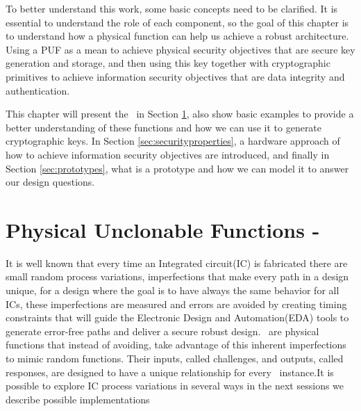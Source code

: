 
To better understand this work, some basic concepts need to be clarified. It is essential to understand the role of each component, so the goal of this chapter is to understand how a physical function can help us achieve a robust architecture. Using a PUF as a mean to achieve physical security objectives that are secure key generation and storage,  and then using this key together with cryptographic primitives to achieve information security objectives that are data integrity and authentication.  

This chapter will present the  \pufs~in Section \ref{sec:pufs}, also show basic examples to provide a better understanding of these functions and how we can use it to generate cryptographic keys. In Section \ref{sec:securityproperties}, a hardware approach of how to achieve information security objectives are introduced, and finally in Section \ref{sec:prototypes}, what is a prototype and how we can model it to answer our design questions.


\section{Physical Unclonable Functions - \pufs~}
\label{sec:pufs}
It is well known that every time an Integrated circuit(IC) is fabricated there are small random process variations, imperfections that make every path in a design unique, for a design where the goal is to have always the same behavior for all ICs, these imperfections are measured and errors are avoided by creating timing constraints that will guide the Electronic Design and Automation(EDA) tools to  generate error-free paths and deliver a \rm{secure} robust design. \pufs~are physical functions that instead of avoiding, take advantage of this inherent imperfections to mimic random functions. Their inputs, called challenges, and outputs, called responses, are designed to have a unique relationship for every \puf~instance.It is possible to explore IC process variations in several ways\cite{DBLP:phdbasesearchMaes12} in the next sessions we describe  possible implementations%

